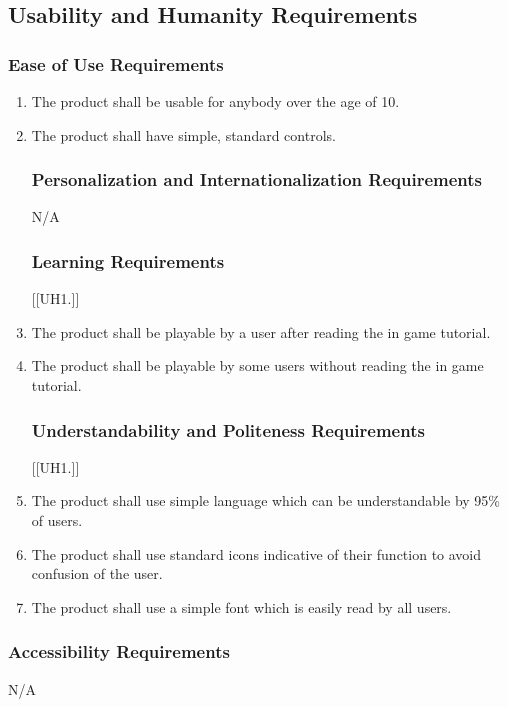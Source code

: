 \documentclass[12pt, titlepage]{article}
\begin{document}
\subsection{Usability and Humanity Requirements}

\subsubsection{Ease of Use Requirements}
\begin{enumerate}[{UH}1. ]
    \item The product shall be usable for anybody over the age of 10.
    \item The product shall have simple, standard controls.

\subsubsection{Personalization and Internationalization Requirements}
N/A

\subsubsection{Learning Requirements}
[{[{UH}1.]}]
    \item The product shall be playable by a user after reading the in game tutorial.
    \item The product shall be playable by some users without reading the in game tutorial.

\subsubsection{Understandability and Politeness Requirements}
[{[{UH}1.]}]
    \item The product shall use simple language which can be understandable by 95\% of users.
    \item The product shall use standard icons indicative of their function to avoid confusion of the user.
    \item The product shall use a simple font which is easily read by all users.
\end{enumerate}

\subsubsection{Accessibility Requirements}
N/A
\end{document}
